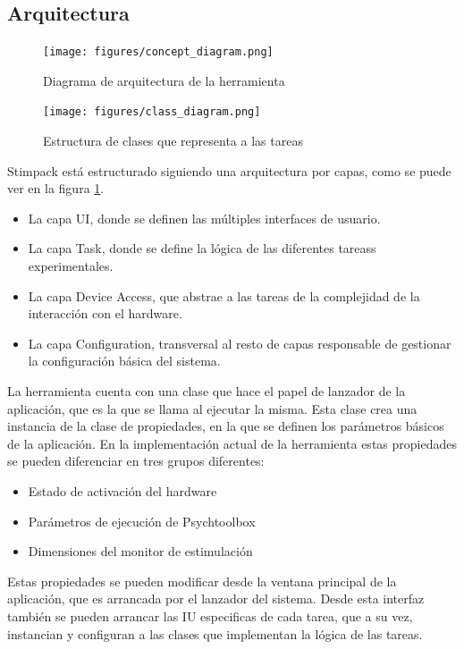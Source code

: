 \documentclass[conference]{IEEEtran}
\begin{document}
\subsection{Arquitectura}

\begin{figure}[htbp]
\centerline{\texttt{[image: figures/concept\_diagram.png]}}
\caption{Diagrama de arquitectura de la herramienta}
\label{figConceptDiagram}
\end{figure}



\begin{figure}[htbp]
\centerline{\texttt{[image: figures/class\_diagram.png]}}
\caption{Estructura de clases que representa a las tareas}
\label{figClassDiagram}
\end{figure}

Stimpack está estructurado siguiendo una arquitectura por capas, como se puede ver en la figura \ref{figConceptDiagram}. 
\begin{itemize}
	\item La capa UI, donde se definen las múltiples interfaces de usuario.
	\item La capa Task, donde se define la lógica de las diferentes tareass experimentales.
	\item La capa Device Access, que abstrae a las tareas de la complejidad de la interacción con el hardware.
	\item La capa Configuration, transversal al resto de capas responsable de gestionar la configuración básica del sistema.
\end{itemize}
La herramienta cuenta con una clase que hace el papel de lanzador de la aplicación, que es la que se llama al ejecutar la misma. Esta clase crea una instancia de la clase de propiedades, en la que se definen los parámetros básicos de la aplicación. En la implementación actual de la herramienta estas propiedades se pueden diferenciar en tres grupos diferentes: 

\begin{itemize}
	\item Estado de activación del hardware
	\item Parámetros de ejecución de Psychtoolbox
	\item Dimensiones del monitor de estimulación
\end{itemize}

Estas propiedades se pueden modificar desde la ventana principal de la aplicación, que es arrancada por el lanzador del sistema. Desde esta interfaz también se pueden arrancar las IU especificas de cada tarea, que a su vez, instancian y configuran a las clases que implementan la lógica de las tareas.
\end{document}
